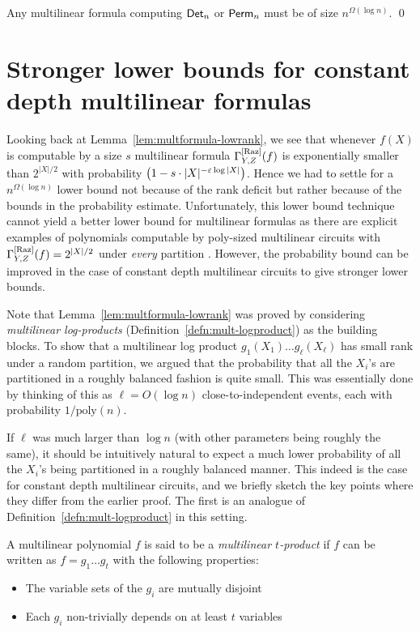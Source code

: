 \begin{theorem} Any multilinear formula computing $\mathsf{Det}_n$ or $\mathsf{Perm}_n$ must be of size $n^{\Omega(\log n)}$. \qed
\end{theorem}


\section{Stronger lower bounds for constant depth multilinear formulas}

Looking back at Lemma~\ref{lem:multformula-lowrank}, we see that whenever $f(X)$ is computable by a size $s$ multilinear formula $\Gamma^{\mathrm{[Raz]}}_{Y,Z}(f)$ is exponentially smaller than $2^{|X|/2}$ with probability $\left(1 - s\cdot |X|^{-\varepsilon \log |X|}\right)$. Hence we had to settle for a $n^{\Omega(\log n)}$ lower bound not because of the rank deficit but rather because of the bounds in the probability estimate. Unfortunately, this lower bound technique cannot yield a better lower bound for multilinear formulas as there are explicit examples of polynomials computable by poly-sized multilinear circuits with $\Gamma^{\mathrm{[Raz]}}_{Y,Z}(f) = 2^{|X|/2}$ under \emph{every} partition \cite{Raz06}. However, the probability bound can be improved in the case of constant depth multilinear circuits to give stronger lower bounds. 


Note that Lemma~\ref{lem:multformula-lowrank} was proved by considering \emph{multilinear log-products} (Definition~\ref{defn:mult-logproduct}) as the building blocks. To show that a multilinear log product $g_1(X_1)\dots g_{\ell}(X_\ell)$ has small rank under a random partition, we argued that the probability that all the $X_i$'s are partitioned in a roughly balanced fashion is quite small. This was essentially done by thinking of this as $\ell = O(\log n)$ close-to-independent events, each with probability $1/\mathrm{poly}(n)$. 

If $\ell$ was much larger than $\log n$ (with other parameters being roughly the same), it should be intuitively natural to expect a much lower probability of all the $X_i$'s being partitioned in a roughly balanced manner. This indeed is the case for constant depth multilinear circuits, and we briefly sketch the key points where they differ from the earlier proof. The first is an analogue of Definition~\ref{defn:mult-logproduct} in this setting. 

\begin{definition}\label{defn:mult-t-prod}
A multilinear polynomial $f$ is said to be a \emph{multilinear $t$-product} if $f$ can be written as $f = g_1\dots g_t$ with the following properties:
\begin{itemize}
\item The variable sets of the $g_i$ are mutually disjoint
\item Each $g_i$ non-trivially depends on at least $t$ variables
\end{itemize}
\end{definition}

